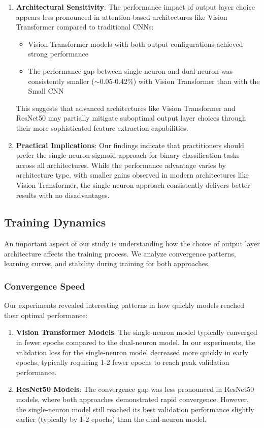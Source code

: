 \documentclass[11pt]{article}
\begin{document}
\begin{enumerate}
\item \textbf{Architectural Sensitivity}: The performance impact of output layer choice appears less pronounced in attention-based architectures like Vision Transformer compared to traditional CNNs:
  \begin{itemize}
  \item Vision Transformer models with both output configurations achieved strong performance
  \item The performance gap between single-neuron and dual-neuron was consistently smaller ($\sim$0.05-0.42\%) with Vision Transformer than with the Small CNN
  \end{itemize}
  
  This suggests that advanced architectures like Vision Transformer and ResNet50 may partially mitigate suboptimal output layer choices through their more sophisticated feature extraction capabilities.

\item \textbf{Practical Implications}: Our findings indicate that practitioners should prefer the single-neuron sigmoid approach for binary classification tasks across all architectures. While the performance advantage varies by architecture type, with smaller gains observed in modern architectures like Vision Transformer, the single-neuron approach consistently delivers better results with no disadvantages.
\end{enumerate}

\subsection{Training Dynamics}
An important aspect of our study is understanding how the choice of output layer architecture affects the training process. We analyze convergence patterns, learning curves, and stability during training for both approaches.

\subsubsection{Convergence Speed}
Our experiments revealed interesting patterns in how quickly models reached their optimal performance:

\begin{enumerate}
\item \textbf{Vision Transformer Models}: The single-neuron model typically converged in fewer epochs compared to the dual-neuron model. In our experiments, the validation loss for the single-neuron model decreased more quickly in early epochs, typically requiring 1-2 fewer epochs to reach peak validation performance.

\item \textbf{ResNet50 Models}: The convergence gap was less pronounced in ResNet50 models, where both approaches demonstrated rapid convergence. However, the single-neuron model still reached its best validation performance slightly earlier (typically by 1-2 epochs) than the dual-neuron model.
\end{enumerate}
\end{document}
